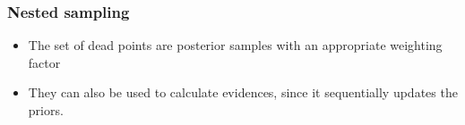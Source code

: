 \documentclass[%
]{beamer}
\newcommand{\lik}{\mathcal{L}}
\newcommand{\ev}{\mathcal{Z}}
\begin{document}
%
%
%
%
%
%
\begin{frame}
  \frametitle{Nested sampling} 

  \begin{itemize}
    \item The set of dead points are posterior samples with an appropriate weighting factor
    \item They can also be used to calculate evidences, since it sequentially updates the priors.
  \end{itemize}
 
\end{frame}
\end{document}
